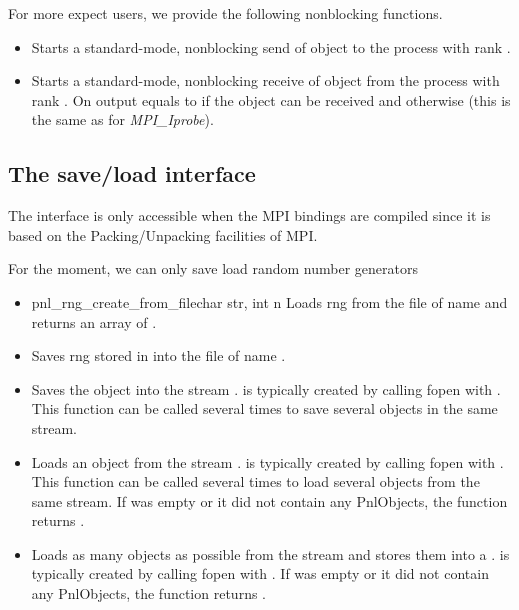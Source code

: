 For more expect users, we provide the following nonblocking functions.
\begin{itemize}
\item {}
  \sshortdescribe Starts a standard-mode, nonblocking send of object
   to the process with rank .
  
  
\item {}
  \sshortdescribe Starts a standard-mode, nonblocking receive of object
   from the process with rank . On output  equals
  to  if the object can be received and  otherwise (this
  is the same as for {\it MPI_Iprobe}).
\end{itemize}

\subsection{The save/load interface}

The interface is only accessible when the MPI bindings are compiled since it
is based on the Packing/Unpacking facilities of MPI.

For the moment, we can only save load random number generators
\begin{itemize}
\item {}
  {pnl_rng_create_from_file}{char \ptr str, int n}
  \sshortdescribe Loads  rng from the file of name  and
  returns an array of  .
\item {}
    \sshortdescribe Saves  rng stored in  into the file of
  name .
\item {}
  \sshortdescribe Saves the object  into the stream . 
  is typically created by calling fopen with . This function can be
  called several times to save several objects in the same stream.
\item {}
  \sshortdescribe Loads an object from the stream . 
  is typically created by calling fopen with .  This function can be
  called several times to load several objects from the same stream. If 
  was empty or it did not contain any PnlObjects, the function returns .
\item {}
  \sshortdescribe Loads as many objects as possible from the stream  and
  stores them into a .  is typically created by
  calling fopen with . If  was empty or it did not contain
  any PnlObjects, the function returns .
\end{itemize}



